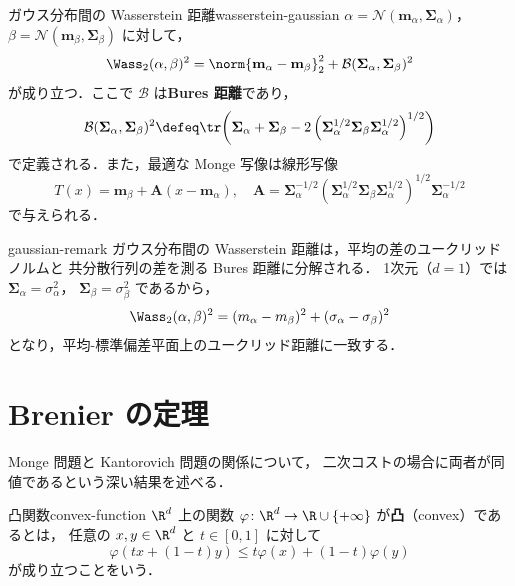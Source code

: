 \begin{theorem}{ガウス分布間の Wasserstein 距離}{wasserstein-gaussian}
  $\alpha = \mathcal{N}(\mathbf{m}_\alpha, \mathbf{\Sigma}_\alpha)$，
  $\beta = \mathcal{N}(\mathbf{m}_\beta, \mathbf{\Sigma}_\beta)$ に対して，
  \[
    \Wass_2(\alpha, \beta)^2
    = \norm{\mathbf{m}_\alpha - \mathbf{m}_\beta}_2^2
    + \mathcal{B}(\mathbf{\Sigma}_\alpha, \mathbf{\Sigma}_\beta)^2
  \]
  が成り立つ．ここで $\mathcal{B}$ は\textbf{Bures 距離}であり，
  \[
    \mathcal{B}(\mathbf{\Sigma}_\alpha, \mathbf{\Sigma}_\beta)^2
    \defeq \tr\!\left(
    \mathbf{\Sigma}_\alpha + \mathbf{\Sigma}_\beta
    - 2 \left( \mathbf{\Sigma}_\alpha^{1/2} \mathbf{\Sigma}_\beta \mathbf{\Sigma}_\alpha^{1/2} \right)^{1/2}
    \right)
  \]
  で定義される．また，最適な Monge 写像は線形写像
  \[
    T(x) = \mathbf{m}_\beta + \mathbf{A}(x - \mathbf{m}_\alpha), \quad
    \mathbf{A} = \mathbf{\Sigma}_\alpha^{-1/2}
    \left( \mathbf{\Sigma}_\alpha^{1/2} \mathbf{\Sigma}_\beta \mathbf{\Sigma}_\alpha^{1/2} \right)^{1/2}
    \mathbf{\Sigma}_\alpha^{-1/2}
  \]
  で与えられる．
\end{theorem}

\begin{remark}{}{gaussian-remark}
  ガウス分布間の Wasserstein 距離は，平均の差のユークリッドノルムと
  共分散行列の差を測る Bures 距離に分解される．
  1次元（$d = 1$）では $\mathbf{\Sigma}_\alpha = \sigma_\alpha^2$，
  $\mathbf{\Sigma}_\beta = \sigma_\beta^2$ であるから，
  \[
    \Wass_2(\alpha, \beta)^2 = (m_\alpha - m_\beta)^2 + (\sigma_\alpha - \sigma_\beta)^2
  \]
  となり，平均-標準偏差平面上のユークリッド距離に一致する．
\end{remark}

\section{Brenier の定理}
\label{sec:brenier}

Monge 問題と Kantorovich 問題の関係について，
二次コストの場合に両者が同値であるという深い結果を述べる．

\begin{definition}{凸関数}{convex-function}
  $\R^d$ 上の関数 $\varphi \colon \R^d \to \R \cup \{+\infty\}$ が\textbf{凸}（convex）であるとは，
  任意の $x, y \in \R^d$ と $t \in [0, 1]$ に対して
  \[
    \varphi(tx + (1-t)y) \leq t\varphi(x) + (1-t)\varphi(y)
  \]
  が成り立つことをいう．
\end{definition}

